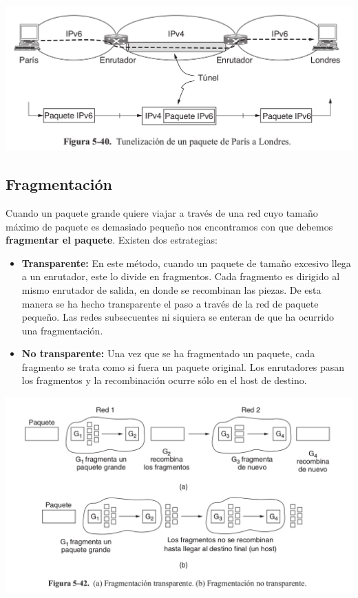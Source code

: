 	\begin{center}
		\includegraphics[scale=0.3]{./imagenes/entunelamiento.png}
	\end{center}

	\subsection{Fragmentación}
	Cuando un paquete grande quiere viajar a través de una red cuyo tamaño máximo de paquete es demasiado pequeño nos encontramos con que debemos \textbf{fragmentar el paquete}.
	Existen dos estrategias:

	\begin{itemize}
		\item \textbf{Transparente:} En este método, cuando un paquete de tamaño excesivo
llega a un enrutador, este lo divide en fragmentos. Cada fragmento es dirigido al mismo enrutador
de salida, en donde se recombinan las piezas. De esta manera se ha hecho transparente el paso a
través de la red de paquete pequeño. Las redes subsecuentes ni siquiera se enteran de que ha ocurrido
una fragmentación.
		\item \textbf{No transparente:} Una vez que se ha fragmentado un paquete, cada fragmento se trata como si fuera un paquete
original. Los enrutadores pasan los fragmentos y la recombinación
ocurre sólo en el host de destino.
	\end{itemize}

	\begin{center}
		\includegraphics[scale=0.3]{./imagenes/fragmentacion.png}
	\end{center}

